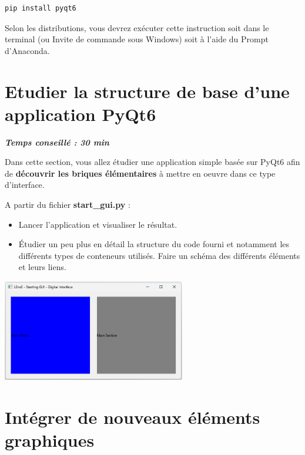 \documentclass[a4paper,11pt,titlepage]{article} %
\begin{document}
\begin{lstlisting}
pip install pyqt6
\end{lstlisting}

Selon les distributions, vous devrez exécuter cette instruction soit dans le terminal (ou Invite de commande sous Windows) soit à l'aide du Prompt d'Anaconda.


\section{Etudier la structure de base d'une application PyQt6}

\begin{center} \textbf{\textit{Temps conseillé : 30 min}} \end{center}

Dans cette section, vous allez étudier une application simple basée sur PyQt6 afin de \textbf{découvrir les briques élémentaires} à mettre en oeuvre dans ce type d'interface.

\medskip

A partir du fichier \textbf{start\_gui.py} :

\begin{itemize}
	\item Lancer l'application et visualiser le résultat.
	\item Étudier un peu plus en détail la structure du code fourni et notamment les différents types de conteneurs utilisés. Faire un schéma des différents éléments et leurs liens.
\end{itemize}

\bigskip

\begin{center}
	\includegraphics[width=0.6\textwidth]{images/start_gui.png}
\end{center}



\section{Intégrer de nouveaux éléments graphiques}		
\end{document}
